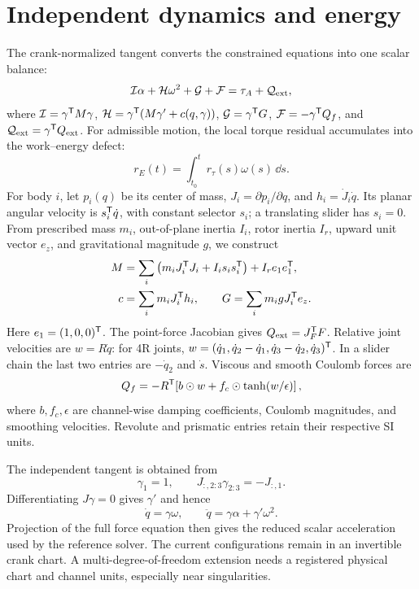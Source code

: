 \section{Independent dynamics and energy}
The crank-normalized tangent converts the constrained equations into one scalar balance:
\begin{equation}
\mathcal I\alpha+\mathcal H\omega^2+\mathcal G+\mathcal F=\tau_A+\mathcal Q_{\rm ext},
\label{eq:reduced}
\end{equation}
where $\mathcal I=\gamma^{\mathsf T} M\gamma$, $\mathcal H=\gamma^{\mathsf T}(M\gamma'+c(q,\gamma))$, $\mathcal G=\gamma^{\mathsf T} G$, $\mathcal F=-\gamma^{\mathsf T} Q_f$, and $\mathcal Q_{\rm ext}=\gamma^{\mathsf T} Q_{\rm ext}$. For admissible motion, the local torque residual accumulates into the work--energy defect:
\begin{equation}
r_E(t)=\int_{t_0}^t r_\tau(s)\omega(s)\,\dd s.
\label{eq:residualpower}
\end{equation}
\label{app:equations}
For body $i$, let $p_i(q)$ be its center of mass, $J_i=\partial p_i/\partial q$, and $h_i=\dot J_i\dot q$. Its planar angular velocity is $s_i^{\mathsf T}\dot q$, with constant selector $s_i$; a translating slider has $s_i=0$. From prescribed mass $m_i$, out-of-plane inertia $I_i$, rotor inertia $I_r$, upward unit vector $e_z$, and gravitational magnitude $g$, we construct
\begin{align}
M&=\sum_i\left(m_iJ_i^{\mathsf T} J_i+I_i s_i s_i^{\mathsf T}\right)+I_r e_1e_1^{\mathsf T},\\
c&=\sum_i m_iJ_i^{\mathsf T} h_i,\qquad
G=\sum_i m_i gJ_i^{\mathsf T} e_z.
\label{eq:bodydynamics}
\end{align}
Here $e_1=(1,0,0)^{\mathsf T}$. The point-force Jacobian gives $Q_{\rm ext}=J_F^{\mathsf T} F$. Relative joint velocities are $w=R\dot q$: for 4R joints, $w=(\dot q_1,\dot q_2-\dot q_1,\dot q_3-\dot q_2,\dot q_3)^{\mathsf T}$. In a slider chain the last two entries are $-\dot q_2$ and $\dot s$. Viscous and smooth Coulomb forces are
\begin{equation}
Q_f=-R^{\mathsf T}\!\left[b\odot w+f_c\odot\tanh(w/\epsilon)\right],
\label{eq:friction}
\end{equation}
where $b,f_c,\epsilon$ are channel-wise damping coefficients, Coulomb magnitudes, and smoothing velocities. Revolute and prismatic entries retain their respective SI units.


The independent tangent is obtained from
\begin{equation}
\gamma_1=1,\qquad
J_{:,2:3}\gamma_{2:3}=-J_{:,1}.
\end{equation}
Differentiating $J\gamma=0$ gives $\gamma'$ and hence
\begin{equation}
\dot q=\gamma\omega,\qquad
\ddot q=\gamma\alpha+\gamma'\omega^2.
\end{equation}
Projection of the full force equation then gives the reduced scalar acceleration used by the reference solver. The current configurations remain in an invertible crank chart. A multi-degree-of-freedom extension needs a registered physical chart and channel units, especially near singularities.

